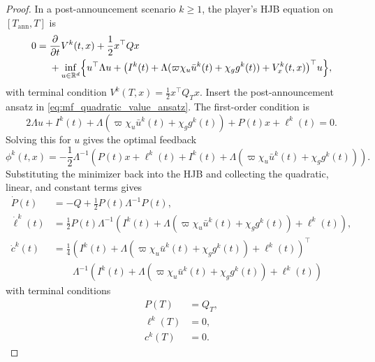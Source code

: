 \documentclass[12pt]{article}
\numberwithin{equation}{section}
\theoremstyle{definition}
\begin{document}
\begin{proof}
In a post-announcement scenario \(k\ge1\), the player's HJB equation on
\([T_{\mathrm{ann}},T]\) is
\[
\begin{aligned}
0
={}&\frac{\partial}{\partial t}V^k(t,x)
+\frac12 x^\top Q x
\\
&+\inf_{u\in\mathbb R^d}
\Bigl\{
u^\top\Lambda u
+\bigl(I^k(t)+\Lambda(\varpi\chi_u\bar u^k(t)+\chi_g g^k(t))
+V_x^k(t,x)\bigr)^\top u
\Bigr\},
\end{aligned}
\]
with terminal condition \(V^k(T,x)=\frac12x^\top Q_T x\). Insert the
post-announcement ansatz in \eqref{eq:mf_quadratic_value_ansatz}.
The first-order condition is
\[
2\Lambda u+I^k(t)+\Lambda(\varpi\chi_u\bar u^k(t)+\chi_g g^k(t))
+P(t)x+\ell^k(t)=0.
\]
Solving this for \(u\) gives the optimal feedback
\begin{equation}\label{eq:mf_post_feedback_derived}
\phi^{k}(t,x)
=
-\frac12\Lambda^{-1}
\left(P(t)x+\ell^k(t)+I^k(t)+
\Lambda(\varpi\chi_u\bar u^k(t)+\chi_g g^k(t))\right).
\end{equation}
Substituting the minimizer back into the HJB and collecting the quadratic,
linear, and constant terms gives
\begin{subequations}\label{eq:mf_post_value_system_derived}
\begin{align}
\dot P(t)
&=
- Q+\frac12P(t)\Lambda^{-1}P(t),
\label{eq:mf_post_riccati_derived}\\
\dot \ell^k(t)
&=
\frac12P(t)\Lambda^{-1}
\left(I^k(t)+\Lambda(\varpi\chi_u\bar u^k(t)+\chi_g g^k(t))+\ell^k(t)\right),
\label{eq:mf_post_ell_derived}\\
\dot c^k(t)
&=
\frac14
\left(I^k(t)+\Lambda(\varpi\chi_u\bar u^k(t)+\chi_g g^k(t))+\ell^k(t)\right)^\top
\\
&\qquad
{}\Lambda^{-1}
\left(I^k(t)+\Lambda(\varpi\chi_u\bar u^k(t)+\chi_g g^k(t))+\ell^k(t)\right)
\label{eq:mf_post_alpha_derived}
\end{align}
\end{subequations}
with terminal conditions
\begin{subequations}\label{eq:mf_post_terminal_conditions_derived}
\begin{align}
P(T)&=Q_T,
\label{eq:mf_P_terminal_derived}\\
\ell^k(T)&=0,
\label{eq:mf_post_ell_terminal_derived}\\
c^k(T)&=0.
\label{eq:mf_post_alpha_terminal_derived}
\end{align}
\end{subequations}


\end{proof}
\end{document}
